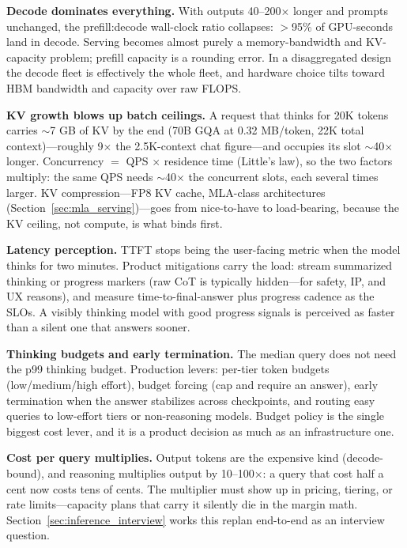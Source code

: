 \textbf{Decode dominates everything.} With outputs 40--200$\times$ longer and prompts unchanged, the prefill:decode wall-clock ratio collapses: $>$95\% of GPU-seconds land in decode. Serving becomes almost purely a memory-bandwidth and KV-capacity problem; prefill capacity is a rounding error. In a disaggregated design the decode fleet is effectively the whole fleet, and hardware choice tilts toward HBM bandwidth and capacity over raw FLOPS.

\textbf{KV growth blows up batch ceilings.} A request that thinks for 20K tokens carries $\sim$7 GB of KV by the end (70B GQA at 0.32 MB/token, 22K total context)---roughly 9$\times$ the 2.5K-context chat figure---and occupies its slot $\sim$40$\times$ longer. Concurrency $=$ QPS $\times$ residence time (Little's law), so the two factors multiply: the same QPS needs $\sim$40$\times$ the concurrent slots, each several times larger. KV compression---FP8 KV cache, MLA-class architectures (Section~\ref{sec:mla_serving})---goes from nice-to-have to load-bearing, because the KV ceiling, not compute, is what binds first.

\textbf{Latency perception.} TTFT stops being the user-facing metric when the model thinks for two minutes. Product mitigations carry the load: stream summarized thinking or progress markers (raw CoT is typically hidden---for safety, IP, and UX reasons), and measure time-to-final-answer plus progress cadence as the SLOs. A visibly thinking model with good progress signals is perceived as faster than a silent one that answers sooner.

\textbf{Thinking budgets and early termination.} The median query does not need the p99 thinking budget. Production levers: per-tier token budgets (low/medium/high effort), budget forcing (cap and require an answer), early termination when the answer stabilizes across checkpoints, and routing easy queries to low-effort tiers or non-reasoning models. Budget policy is the single biggest cost lever, and it is a product decision as much as an infrastructure one.

\textbf{Cost per query multiplies.} Output tokens are the expensive kind (decode-bound), and reasoning multiplies output by 10--100$\times$: a query that cost half a cent now costs tens of cents. The multiplier must show up in pricing, tiering, or rate limits---capacity plans that carry it silently die in the margin math. Section~\ref{sec:inference_interview} works this replan end-to-end as an interview question.

